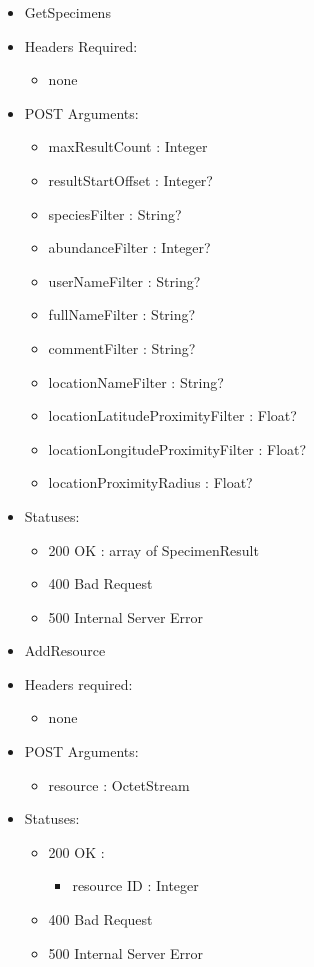 \begin{itemize}
        \item GetSpecimens
        \item Headers Required:
        \begin{itemize}
        	\item none
        \end{itemize}
        \item POST Arguments:
        \begin{itemize}
            \item maxResultCount : Integer
            \item resultStartOffset : Integer?
        	\item speciesFilter : String?
            \item abundanceFilter : Integer?
            \item userNameFilter : String?
            \item fullNameFilter : String?
            \item commentFilter : String?
            \item locationNameFilter : String?
            \item locationLatitudeProximityFilter : Float?
            \item locationLongitudeProximityFilter : Float?
            \item locationProximityRadius : Float?
        \end{itemize}
        \item Statuses: 
        \begin{itemize}
        	\item 200 OK : array of SpecimenResult
        	\item 400 Bad Request
        	\item 500 Internal Server Error
        \end{itemize}

        \item AddResource
        \item Headers required: 
        \begin{itemize}
            \item none
        \end{itemize}
        \item POST Arguments:
        \begin{itemize}
        	\item resource : OctetStream
        \end{itemize}
        \item Statuses:
        \begin{itemize}
        	\item 200 OK :
            \begin{itemize}
        		\item resource ID : Integer
            \end{itemize}
        	\item 400 Bad Request
        	\item 500 Internal Server Error
        \end{itemize}


\end{itemize}
